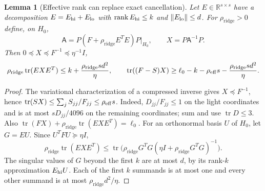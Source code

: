 \documentclass[11pt]{amsart}
\newtheorem{lemma}[theorem]{Lemma}
\theoremstyle{definition}\newtheorem{definition}[theorem]{Definition}
\theoremstyle{remark}\newtheorem{remark}[theorem]{Remark}
\numberwithin{equation}{section}
\newcommand{\tr}{\operatorname{tr}}
\newcommand{\rank}{\operatorname{rank}}
\begin{document}
\begin{lemma}[Effective rank can replace exact cancellation]\label{r:trace}
Let $E\in\mathbb R^{s\times s}$ have a decomposition
$E=E_{\rm hi}+E_{\rm lo}$ with $\rank E_{\rm hi}\le k$ and
$\|E_{\rm lo}\|\le d$. For $\rho_{\mathrm{ridge}}>0$ define, on $H_0$,
\begin{equation}\label{r:operator}
 \mathsf{A}=P(F+\rho_{\mathrm{ridge}} E^TE)P\big|_{H_0},\qquad
 X=P \mathsf{A}^{-1}P.
\end{equation}
Then $0\preceq X\preceq F^{-1}\preceq\eta^{-1}I$,
\[
 \rho_{\mathrm{ridge}}\tr(EXE^T)\le k+\frac{\rho_{\mathrm{ridge}} s d^2}{\eta},\qquad
 \tr((F-S)X)\ge
 \ell_0-k-\rho_{\rm eff}s-\frac{\rho_{\mathrm{ridge}} s d^2}{\eta}.
\]
\end{lemma}
\begin{proof}
The variational characterization of a compressed inverse gives
$X\preceq F^{-1}$, hence
$\tr(SX)\le\sum_j S_{jj}/F_{jj}\le\rho_{\rm eff}s$.
Indeed, $D_{jj}/F_{jj}\le1$ on the light coordinates and is at most
$sD_{jj}/4096$ on the remaining coordinates; sum and use $\tr D\le3$.
Also $\tr(FX)+\rho_{\mathrm{ridge}}\tr(EXE^T)=\ell_0$.
For an orthonormal basis $U$ of $H_0$, let $G=EU$. Since
$U^TFU\succeq\eta I$,
\[
 \rho_{\mathrm{ridge}}\tr(EXE^T)
 \le\tr\bigl(\rho_{\mathrm{ridge}} G^TG(\eta I+\rho_{\mathrm{ridge}} G^TG)^{-1}\bigr).
\]
The singular values of $G$ beyond the first $k$ are at most $d$, by its
rank-$k$ approximation $E_{\rm hi}U$. Each of the first $k$ summands is
at most one and every other summand is at most $\rho_{\mathrm{ridge}} d^2/\eta$.
\end{proof}
\end{document}
